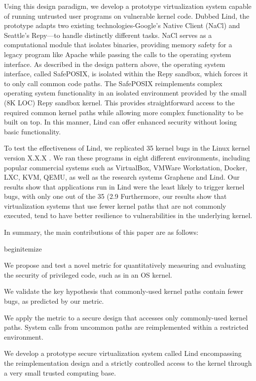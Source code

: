 Using this design paradigm, we develop a prototype virtualization system capable
of running untrusted user programs on vulnerable kernel code. Dubbed Lind, the
prototype adapts two existing technologies-Google’s Native Client (NaCl) and
Seattle’s Repy—to handle distinctly different tasks. NaCl serves as a computational
module that isolates binaries, providing memory safety for a legacy program like
Apache while passing the calls to the operating system interface.  As described
in the design pattern above, the operating system interface, called SafePOSIX,
is isolated within the Repy sandbox, which forces it to only call common code paths.
The SafePOSIX reimplements complex operating system functionality in an isolated
environment provided by the small (8K LOC) Repy sandbox kernel. This provides
straightforward access to the required common kernel paths while allowing more
complex functionality to be built on top.
In this manner, Lind can offer enhanced security without losing basic functionality.

To test the effectiveness of Lind, we replicated 35 kernel bugs in the Linux kernel
version X.X.X .  We ran these programs in eight different environments, including
popular commercial systems such as VirtualBox, VMWare Workstation, Docker, LXC,
KVM, QEMU, as well as the research systems Graphene and Lind. Our results show
that applications run in Lind were the least likely to trigger kernel bugs,
with only one out of the 35 (2.9%
Furthermore, our results show that virtualization systems that use fewer kernel
paths that are not commonly executed, tend to have better resilience to vulnerabilities
in the underlying kernel.  

In summary, the main contributions of this paper are as follows:

begin{itemize}
\item
We propose and test a novel metric for quantitatively measuring and evaluating
the security of privileged code, such as in an OS kernel.

\item
We validate the key hypothesis that commonly-used kernel paths contain fewer bugs,
as predicted by our metric.

\item
We apply the metric to a secure design that accesses only commonly-used
kernel paths. System calls from uncommon paths are reimplemented within a
restricted environment.

\item
We develop a prototype secure virtualization system called Lind encompassing
the reimplementation design and a strictly controlled access to the kernel
through a very small trusted computing base.


